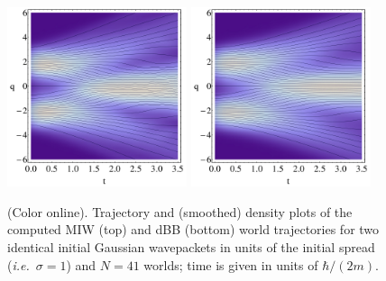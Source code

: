 \documentclass[12pt, aps,pra,amsmath,amssymb,superscriptaddress]{revtex4-2}
\newcommand{\ie}{{\em i.e.}}
\renewcommand{\(}{\left(}
\renewcommand{\)}{\right)}
\newcommand{\blk}{\color{black}}
\begin{document}
\begin{figure}[!t]
    \begin{center}
        \includegraphics[width=0.47\textwidth]{MIW_density_trajectories_black.jpg}
        \includegraphics[width=0.47\textwidth]{dBB_density_trajectories_black.jpg}
    \end{center}
    \caption{\label{dynamics} (Color online).
       Trajectory and (smoothed) density plots
        of the computed MIW (top) and dBB (bottom) world 
        trajectories 
    for two identical initial Gaussian wavepackets in units of the initial
spread (\ie~$\sigma=1$) and $N=41$ worlds; time is given in units of
$\hbar/(2m)$.\blk}
\end{figure}
\end{document}
